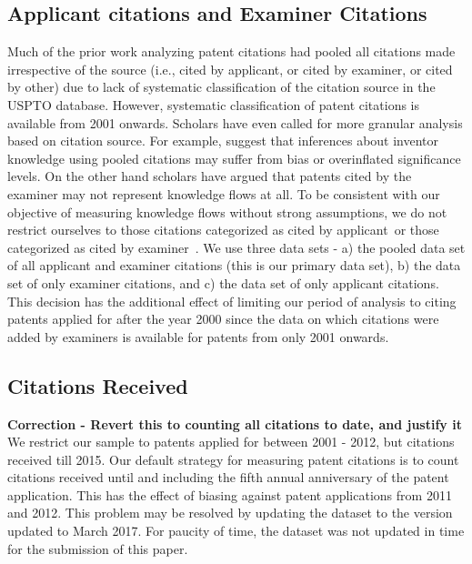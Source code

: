 \documentclass[12pt,letterpaper]{article}
\begin{document}
\subsection{Applicant citations and Examiner Citations}
Much of the prior work analyzing patent citations had pooled all citations made irrespective of the source (i.e., cited by applicant, or cited by examiner, or cited by other) due to lack of systematic classification of the citation source in the USPTO database. However, systematic classification of patent citations is available from 2001 onwards. Scholars have even called for more granular analysis based on citation source. For example, \cite{Alcacer2006a} suggest that inferences about inventor knowledge using pooled citations may suffer from bias or overinflated significance levels. On the other hand scholars have argued that patents cited by the examiner may not represent knowledge flows at all. To be consistent with our objective of measuring knowledge flows without strong assumptions, we do not restrict ourselves to those citations categorized as \textquotesingle cited by applicant\textquotesingle \ or those categorized as \textquotesingle cited by examiner\textquotesingle \ . We use three data sets - a) the pooled data set of all applicant and examiner citations (this is our primary data set), b) the data set of only examiner citations, and c) the data set of only applicant citations. This decision has the additional effect of limiting our period of analysis to citing patents applied for after the year 2000 since the data on which citations were added by examiners is available for patents from only 2001 onwards. 

\subsection{Citations Received}
\textbf{Correction - Revert this to counting all citations to date, and justify it}
We restrict our sample to patents applied for between 2001 - 2012, but citations received till 2015. Our default strategy for measuring patent citations is to count citations received until and including the fifth annual anniversary of the patent application. This has the effect of biasing against patent applications from 2011 and 2012.  This problem may be resolved by updating the dataset to the version updated to March 2017. For paucity of time, the dataset was not updated in time for the submission of this paper.\par
\end{document}
